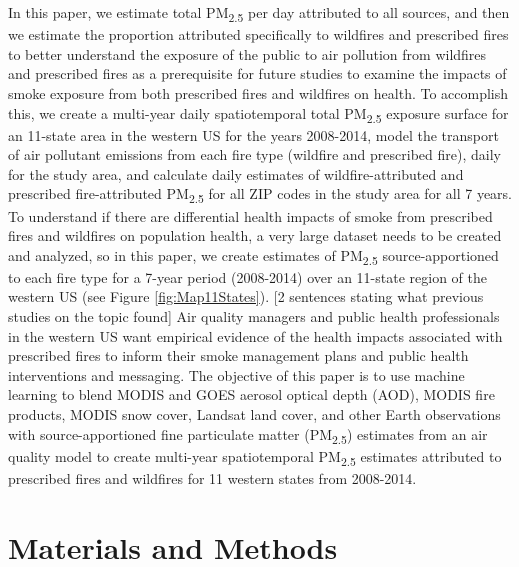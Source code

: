 \documentclass[authoryear]{elsarticle}
\begin{document}
In this paper, we estimate total PM\textsubscript{2.5} per day attributed to all sources, and then we estimate the proportion attributed specifically to wildfires and prescribed fires to better understand the exposure of the public to air pollution from wildfires and prescribed fires as a prerequisite for future studies to examine the impacts of smoke exposure from both prescribed fires and wildfires on health.
To accomplish this, we create a multi-year daily spatiotemporal total PM\textsubscript{2.5} exposure surface for an 11-state area in the western US for the years 2008-2014, model the transport of air pollutant emissions from each fire type (wildfire and prescribed fire), daily for the study area, and calculate daily estimates of wildfire-attributed and prescribed fire-attributed PM\textsubscript{2.5} for all ZIP codes in the study area for all 7 years.
To understand if there are differential health impacts of smoke from prescribed fires and wildfires on population health, a very large dataset needs to be created and analyzed, so in this paper, we
create estimates of PM\textsubscript{2.5} source-apportioned to each fire type for a 7-year period (2008-2014) over an 11-state region of the western US (see Figure \ref{fig:Map11States}). 
[2 sentences stating what previous studies on the topic found]
Air quality managers and public health professionals in the western US want empirical evidence of the health impacts associated with prescribed fires to inform their smoke management plans and public health interventions and messaging. 
The objective of this paper is to use machine learning to blend MODIS and GOES aerosol optical depth (AOD), MODIS fire products, MODIS snow cover, Landsat land cover, and other Earth observations with source-apportioned fine particulate matter (PM\textsubscript{2.5}) estimates from an air quality model to create multi-year spatiotemporal PM\textsubscript{2.5} estimates attributed to prescribed fires and wildfires for 11 western states from 2008-2014.

\section{Materials and Methods} %
\end{document}
